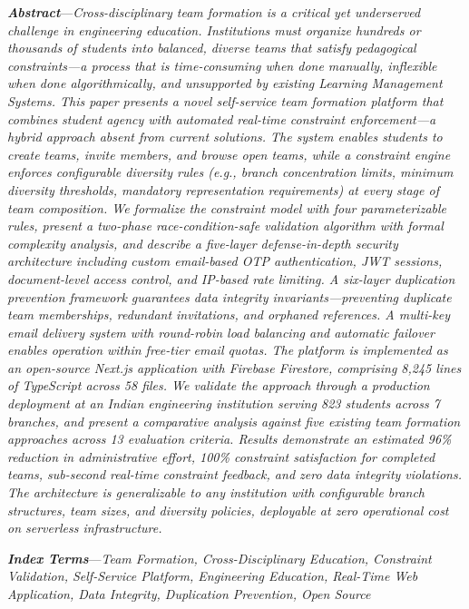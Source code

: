 \documentclass[12pt,a4paper]{article}
\begin{document}
\textbf{\textit{Abstract}}---\textit{Cross-disciplinary team formation is a critical yet underserved challenge in engineering education. Institutions must organize hundreds or thousands of students into balanced, diverse teams that satisfy pedagogical constraints---a process that is time-consuming when done manually, inflexible when done algorithmically, and unsupported by existing Learning Management Systems. This paper presents a novel self-service team formation platform that combines student agency with automated real-time constraint enforcement---a hybrid approach absent from current solutions. The system enables students to create teams, invite members, and browse open teams, while a constraint engine enforces configurable diversity rules (e.g., branch concentration limits, minimum diversity thresholds, mandatory representation requirements) at every stage of team composition. We formalize the constraint model with four parameterizable rules, present a two-phase race-condition-safe validation algorithm with formal complexity analysis, and describe a five-layer defense-in-depth security architecture including custom email-based OTP authentication, JWT sessions, document-level access control, and IP-based rate limiting. A six-layer duplication prevention framework guarantees data integrity invariants---preventing duplicate team memberships, redundant invitations, and orphaned references. A multi-key email delivery system with round-robin load balancing and automatic failover enables operation within free-tier email quotas. The platform is implemented as an open-source Next.js application with Firebase Firestore, comprising 8,245 lines of TypeScript across 58 files. We validate the approach through a production deployment at an Indian engineering institution serving 823 students across 7 branches, and present a comparative analysis against five existing team formation approaches across 13 evaluation criteria. Results demonstrate an estimated 96\% reduction in administrative effort, 100\% constraint satisfaction for completed teams, sub-second real-time constraint feedback, and zero data integrity violations. The architecture is generalizable to any institution with configurable branch structures, team sizes, and diversity policies, deployable at zero operational cost on serverless infrastructure.}

\vspace{4pt}

\textbf{\textit{Index Terms}}---\textit{Team Formation, Cross-Disciplinary Education, Constraint Validation, Self-Service Platform, Engineering Education, Real-Time Web Application, Data Integrity, Duplication Prevention, Open Source}
\end{document}
